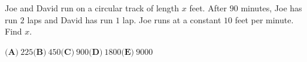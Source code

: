 Joe and David run on a circular track of length $x$ feet. After $90$ minutes, Joe has run $2$ laps and David has run $1$ lap. Joe runs at a constant $10$ feet per minute. Find $x$.

$\textbf{(A)}\ 225$\qquad$\textbf{(B)}\ 450$\qquad$\textbf{(C)}\ 900$\qquad$\textbf{(D)}\ 1800$\qquad$\textbf{(E)}\ 9000$
